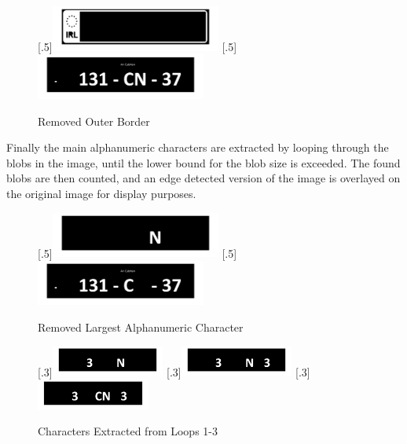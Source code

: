 \documentclass[a4paper]{article}
\begin{document}
	\begin{figure}[H]
		\centering
		[.5\linewidth]{\includegraphics[height=1.5cm]{Results/Q2/NumPlate1/qanumber_plate_1Border.jpg}}%
		[.5\linewidth]{\includegraphics[height=1.5cm]{Results/Q2/NumPlate1/qanumber_plate_1NoBorder.jpg}}%
		\caption{Removed Outer Border}
		\label{fig:}
	\end{figure}
	\par Finally the main alphanumeric characters are extracted by looping
	through the blobs in the image, until the lower bound for the blob size
	is exceeded. The found blobs are then counted, and an edge detected
	version of the image is overlayed on the original image for display
	purposes.
	\begin{figure}[H]
		\centering
		[.5\linewidth]{\includegraphics[height=1.5cm]{Results/Q2/NumPlate1/qanumber_plate_1BigChar.jpg}}%
		[.5\linewidth]{\includegraphics[height=1.5cm]{Results/Q2/NumPlate1/qanumber_plate_1Remain.jpg}}%
		\caption{Removed Largest Alphanumeric Character}
		\label{fig:}
	\end{figure}
	\begin{figure}[H]
		\centering
		[.3\linewidth]{\includegraphics[height=1cm]{Results/Q2/NumPlate1/qanumber_plate_1Added1.jpg}}%
		[.3\linewidth]{\includegraphics[height=1cm]{Results/Q2/NumPlate1/qanumber_plate_1Added2.jpg}}%
		[.3\linewidth]{\includegraphics[height=1cm]{Results/Q2/NumPlate1/qanumber_plate_1Added3.jpg}}%
		\caption{Characters Extracted from Loops 1-3}
		\label{fig:}
	\end{figure}
\end{document}
